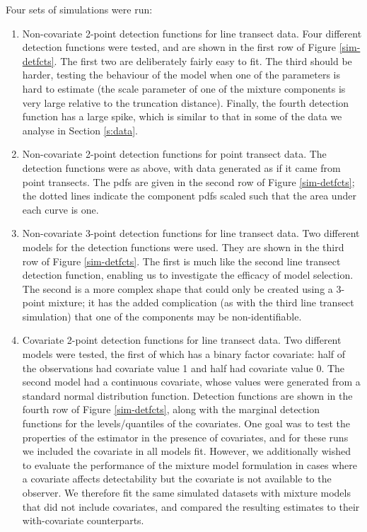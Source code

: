 \documentclass[useAMS,referee, usegraphicx]{biom}
\begin{document}
Four sets of simulations were run:
\begin{enumerate}
	\item Non-covariate 2-point detection functions for line transect data. Four different detection functions were tested, and are shown in the first row of Figure \ref{sim-detfcts}. The first two are deliberately fairly easy to fit. The third should be harder, testing the behaviour of the model when one of the parameters is hard to estimate (the scale parameter of one of the mixture components is very large relative to the truncation distance). Finally, the fourth detection function has a large spike, which is similar to that in some of the data we analyse in Section \ref{s:data}.
	\item Non-covariate 2-point detection functions for point transect data.  The detection functions were as above, with data generated as if it came from point transects. The pdfs are given in the second row of Figure \ref{sim-detfcts}; the dotted lines indicate the component pdfs scaled such that the area under each curve is one.
	\item Non-covariate 3-point detection functions for line transect data. Two different models for the detection functions were used. They are shown in the third row of Figure \ref{sim-detfcts}. The first is much like the second line transect detection function, enabling us to investigate the efficacy of model selection. The second is a more complex shape that could only be created using a 3-point mixture; it has the added complication (as with the third line transect simulation) that one of the components may be non-identifiable.
	\item Covariate 2-point detection functions for line transect data. Two different models were tested, the first of which has a binary factor covariate: half of the observations had covariate value 1 and half had covariate value 0. The second model had a continuous covariate, whose values were generated from a standard normal distribution function. Detection functions are shown in the fourth row of Figure \ref{sim-detfcts}, along with the marginal detection functions for the levels/quantiles of the covariates. One goal was to test the properties of the estimator in the presence of covariates, and for these runs we included the covariate in all models fit.  However, we additionally wished to evaluate the performance of the mixture model formulation in cases where a covariate affects detectability but the covariate is not available to the observer.  We therefore fit the same simulated datasets with mixture models that did not include covariates, and compared the resulting estimates to their with-covariate counterparts.
\end{enumerate}
\end{document}
